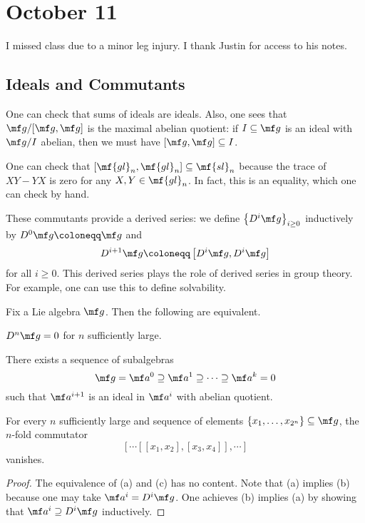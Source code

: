 \documentclass[../notes.tex]{subfiles}
\begin{document}
\section{October 11}
I missed class due to a minor leg injury. I thank Justin for access to his notes.

\subsection{Ideals and Commutants}
One can check that sums of ideals are ideals. Also, one sees that $\mf g/[\mf g,\mf g]$ is the maximal abelian quotient: if $I\subseteq\mf g$ is an ideal with $\mf g/I$ abelian, then we must have $[\mf g,\mf g]\subseteq I$.
\begin{example}
	One can check that $[\mf{gl}_n,\mf{gl}_n]\subseteq\mf{sl}_n$ because the trace of $XY-YX$ is zero for any $X,Y\in\mf{gl}_n$. In fact, this is an equality, which one can check by hand.
\end{example}
These commutants provide a derived series: we define $\left\{D^i\mf g\right\}_{i\ge0}$ inductively by $D^0\mf g\coloneqq\mf g$ and
\[D^{i+1}\mf g\coloneqq\left[D^i\mf g,D^i\mf g\right]\]
for all $i\ge0$. This derived series plays the role of derived series in group theory. For example, one can use this to define solvability.
\begin{proposition}
	Fix a Lie algebra $\mf g$. Then the following are equivalent.
	\begin{listalph}
		\item $D^n\mf g=0$ for $n$ sufficiently large.
		\item There exists a sequence of subalgebras
		\[\mf g=\mf a^0\supseteq\mf a^1\supseteq\cdots\supseteq\mf a^k=0\]
		such that $\mf a^{i+1}$ is an ideal in $\mf a^i$ with abelian quotient.
		\item For every $n$ sufficiently large and sequence of elements $\{x_1,\ldots,x_{2^n}\}\subseteq\mf g$, the $n$-fold commutator
		\[[\cdots[[x_1,x_2],[x_3,x_4]],\cdots]\]
		vanishes.
	\end{listalph}
\end{proposition}
\begin{proof}
	The equivalence of (a) and (c) has no content. Note that (a) implies (b) because one may take $\mf a^i=D^i\mf g$. One achieves (b) implies (a) by showing that $\mf a^i\supseteq D^i\mf g$ inductively.
\end{proof}
\end{document}
